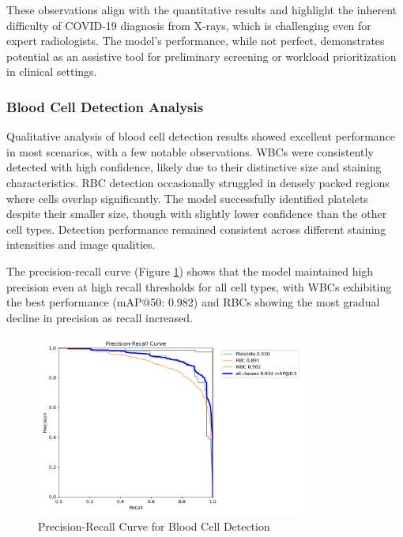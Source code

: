 \begin{multicols}{2}
These observations align with the quantitative results and highlight the inherent difficulty of COVID-19 diagnosis from X-rays, which is challenging even for expert radiologists. The model's performance, while not perfect, demonstrates potential as an assistive tool for preliminary screening or workload prioritization in clinical settings.

\subsubsection{Blood Cell Detection Analysis}

Qualitative analysis of blood cell detection results showed excellent performance in most scenarios, with a few notable observations. WBCs were consistently detected with high confidence, likely due to their distinctive size and staining characteristics. RBC detection occasionally struggled in densely packed regions where cells overlap significantly. The model successfully identified platelets despite their smaller size, though with slightly lower confidence than the other cell types. Detection performance remained consistent across different staining intensities and image qualities.

The precision-recall curve (Figure \ref{fig:blood_cell_pr}) shows that the model maintained high precision even at high recall thresholds for all cell types, with WBCs exhibiting the best performance (mAP@50: 0.982) and RBCs showing the most gradual decline in precision as recall increased.
\end{multicols}

\begin{figure}[ht]
\centering
\includegraphics[width=0.8\textwidth]{datas/blood_cell_summary_datas/blood_cells_PR_curve.png}
\caption{Precision-Recall Curve for Blood Cell Detection}
\label{fig:blood_cell_pr}
\end{figure}


